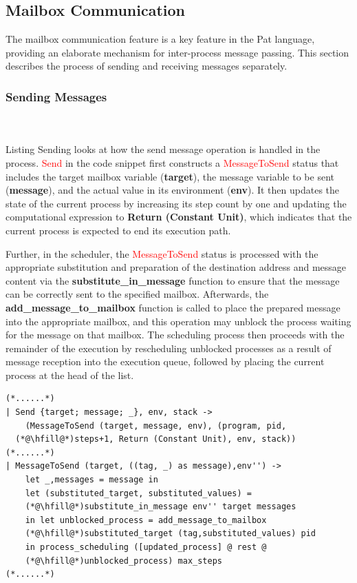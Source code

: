\documentclass{l4proj}
\begin{document}
\subsection{Mailbox Communication}
The mailbox communication feature is a key feature in the Pat language, providing an elaborate mechanism for inter-process message passing. This section describes the process of sending and receiving messages separately. 

\subsubsection{Sending Messages} \hfill\\\\
Listing Sending looks at how the send message operation is handled in the process. \textcolor{red}{Send} in the code snippet first constructs a \textcolor{red}{MessageToSend} status that includes the target mailbox variable (\textbf{target}), the message variable to be sent (\textbf{message}), and the actual value in its environment (\textbf{env}). It then updates the state of the current process by increasing its step count by one and updating the computational expression to \textbf{Return (Constant Unit)}, which indicates that the current process is expected to end its execution path.

Further, in the scheduler, the \textcolor{red}{MessageToSend} status is processed with the appropriate substitution and preparation of the destination address and message content via the \textbf{substitute\_in\_message} function to ensure that the message can be correctly sent to the specified mailbox. Afterwards, the \textbf{add\_message\_to\_mailbox} function is called to place the prepared message into the appropriate mailbox, and this operation may unblock the process waiting for the message on that mailbox. The scheduling process then proceeds with the remainder of the execution by rescheduling unblocked processes as a result of message reception into the execution queue, followed by placing the current process at the head of the list.

\noindent\begin{minipage}{\linewidth}
\lstset{style=Ocamlstyle,}
\begin{lstlisting}[caption={Message Sending in Pat}, label={lst:Sending}]
(*......*)
| Send {target; message; _}, env, stack ->
    (MessageToSend (target, message, env), (program, pid, 
  (*@\hfill@*)steps+1, Return (Constant Unit), env, stack))
(*......*)
| MessageToSend (target, ((tag, _) as message),env'') ->
    let _,messages = message in
    let (substituted_target, substituted_values) = 
    (*@\hfill@*)substitute_in_message env'' target messages 
    in let unblocked_process = add_message_to_mailbox 
    (*@\hfill@*)substituted_target (tag,substituted_values) pid 
    in process_scheduling ([updated_process] @ rest @ 
    (*@\hfill@*)unblocked_process) max_steps
(*......*)
\end{lstlisting}
\end{minipage}
 
\end{document}
